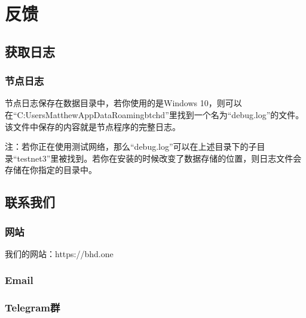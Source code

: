 \chapter{反馈}
\section{获取日志}
\subsection{节点日志}
\begin{flushleft}
    节点日志保存在数据目录中，若你使用的是Windows 10，则可以在``C:UsersMatthewAppDataRoamingbtchd''里找到一个名为``debug.log''的文件。该文件中保存的内容就是节点程序的完整日志。
\end{flushleft}
\small
\begin{flushleft}
    注：若你正在使用测试网络，那么``debug.log''可以在上述目录下的子目录``testnet3''里被找到。若你在安装的时候改变了数据存储的位置，则日志文件会存储在你指定的目录中。
\end{flushleft}
\normalsize
\section{联系我们}
\subsection{网站}
\begin{flushleft}
    我们的网站：https://bhd.one
\end{flushleft}
\subsection{Email}
\subsection{Telegram群}
